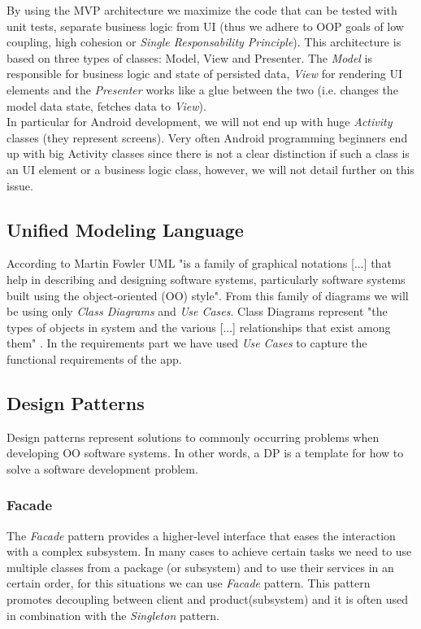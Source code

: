 \documentclass{article}[11]
\begin{document}
	 By using the \ac{MVP} architecture we maximize the code that can be tested with unit tests, separate business logic from UI (thus we adhere to OOP goals of low coupling, high cohesion or \emph{Single Responsability Principle}).  This architecture is based on three types of classes: Model, View and Presenter. The \emph{Model} is responsible for business logic and state of persisted data, \emph{View} for rendering UI elements and the \emph{Presenter} works like a glue between the two (i.e. changes the model data state, fetches data to \emph{View}).\\
	
	 In particular for Android development, we will not end up with huge \emph{Activity} classes (they represent screens). Very often Android programming beginners end up with big Activity classes since there is not a clear distinction if such a class is an UI element or a business logic class, however, we will not detail further on this issue.
	
	\subsection{Unified Modeling Language}
	According to Martin Fowler \cite{fowler2004uml} \ac{UML} "is a family of graphical notations [...] that help in describing and designing software systems, particularly software systems built using the object-oriented (OO) style". From this family of diagrams we will be using only \emph{Class Diagrams}  and \emph{Use Cases}. Class Diagrams represent "the types of objects in system and the various [...] relationships that exist among them" . In the requirements  part we have used \emph{Use Cases} to capture the functional requirements of the app.
	\subsection{Design Patterns}
	Design patterns represent solutions to commonly occurring  problems when developing OO software systems. In other words, a DP is a template for how to solve a software development problem.
	\subsubsection{Facade}
	The \emph{Facade} pattern provides a higher-level interface that eases the interaction with a complex subsystem. In many cases to achieve  certain tasks we need to use multiple classes from a package (or subsystem) and to use their services in an certain order, for this situations we can use \emph{Facade} pattern. This pattern promotes decoupling between client and product(subsystem) and it is often used in combination with the \emph{Singleton} pattern.
	
\end{document}
